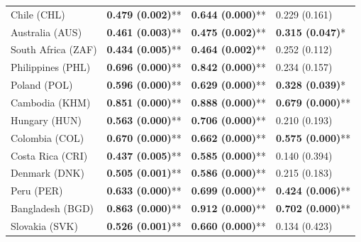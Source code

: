 \begin{longtable}{p{5cm}p{3cm}p{3cm}p{5cm}}
Chile (CHL) & \textcolor{atlLime600}{\textbf{0.479 (0.002)}**} & \textcolor{atlLime600}{\textbf{0.644 (0.000)}**} & \textcolor{atlOrange600}{0.229 (0.161)} \\
Australia (AUS) & \textcolor{atlLime600}{\textbf{0.461 (0.003)}**} & \textcolor{atlLime600}{\textbf{0.475 (0.002)}**} & \textcolor{atlLime600}{\textbf{0.315 (0.047)}*} \\
South Africa (ZAF) & \textcolor{atlLime600}{\textbf{0.434 (0.005)}**} & \textcolor{atlLime600}{\textbf{0.464 (0.002)}**} & \textcolor{atlOrange600}{0.252 (0.112)} \\
Philippines (PHL) & \textcolor{atlLime600}{\textbf{0.696 (0.000)}**} & \textcolor{atlLime600}{\textbf{0.842 (0.000)}**} & \textcolor{atlOrange600}{0.234 (0.157)} \\
Poland (POL) & \textcolor{atlLime600}{\textbf{0.596 (0.000)}**} & \textcolor{atlLime600}{\textbf{0.629 (0.000)}**} & \textcolor{atlLime600}{\textbf{0.328 (0.039)}*} \\
Cambodia (KHM) & \textcolor{atlLime600}{\textbf{0.851 (0.000)}**} & \textcolor{atlLime600}{\textbf{0.888 (0.000)}**} & \textcolor{atlLime600}{\textbf{0.679 (0.000)}**} \\
Hungary (HUN) & \textcolor{atlLime600}{\textbf{0.563 (0.000)}**} & \textcolor{atlLime600}{\textbf{0.706 (0.000)}**} & \textcolor{atlOrange600}{0.210 (0.193)} \\
Colombia (COL) & \textcolor{atlLime600}{\textbf{0.670 (0.000)}**} & \textcolor{atlLime600}{\textbf{0.662 (0.000)}**} & \textcolor{atlLime600}{\textbf{0.575 (0.000)}**} \\
Costa Rica (CRI) & \textcolor{atlLime600}{\textbf{0.437 (0.005)}**} & \textcolor{atlLime600}{\textbf{0.585 (0.000)}**} & \textcolor{atlOrange600}{0.140 (0.394)} \\
Denmark (DNK) & \textcolor{atlLime600}{\textbf{0.505 (0.001)}**} & \textcolor{atlLime600}{\textbf{0.586 (0.000)}**} & \textcolor{atlOrange600}{0.215 (0.183)} \\
Peru (PER) & \textcolor{atlLime600}{\textbf{0.633 (0.000)}**} & \textcolor{atlLime600}{\textbf{0.699 (0.000)}**} & \textcolor{atlLime600}{\textbf{0.424 (0.006)}**} \\
Bangladesh (BGD) & \textcolor{atlLime600}{\textbf{0.863 (0.000)}**} & \textcolor{atlLime600}{\textbf{0.912 (0.000)}**} & \textcolor{atlLime600}{\textbf{0.702 (0.000)}**} \\
Slovakia (SVK) & \textcolor{atlLime600}{\textbf{0.526 (0.001)}**} & \textcolor{atlLime600}{\textbf{0.660 (0.000)}**} & \textcolor{atlOrange600}{0.134 (0.423)} \\

\end{longtable}
